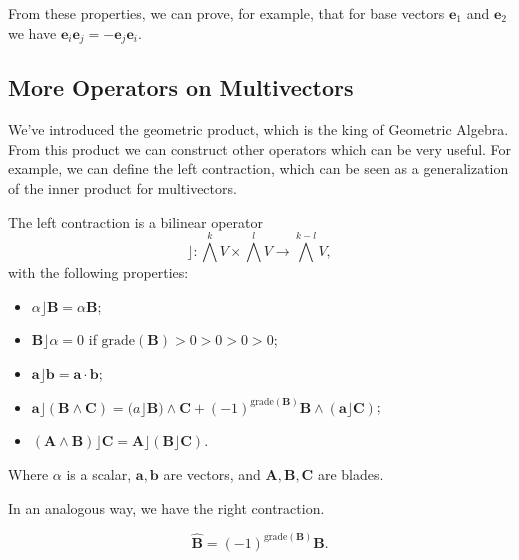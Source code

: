 From these properties, we can prove, for example, that for base vectors $\mathbf e_1$ and $\mathbf e_2$ we have
$\mathbf e_i \mathbf e_j = - \mathbf e_j \mathbf e_i$.

\subsection{More Operators on Multivectors}

We've introduced the geometric product, which is the king of Geometric Algebra.
From this product we can construct other operators which can be very useful. For example,
we can define the left contraction, which can be seen as a generalization of the inner product
for multivectors.

\begin{definition}
    The left contraction is a bilinear operator
    \begin{displaymath}
        \rfloor : \bigwedge^k V \times \bigwedge^l V \to \bigwedge^{k-l} V,
    \end{displaymath}
    with the following properties:
    \begin{itemize}
        \item $\alpha \rfloor \mathbf B  = \alpha \mathbf B$;
        \item $\mathbf B \rfloor \alpha = 0$ if $\text{grade}(\mathbf B) > 0 > 0 > 0 > 0$;
        \item $\mathbf a \rfloor \mathbf b = \mathbf a \cdot \mathbf b$;
        \item $\mathbf a \rfloor (\mathbf B \wedge \mathbf C) = \mathbf (a \rfloor \mathbf B)\wedge \mathbf C + (-1)^{\text{grade}(\mathbf B)} \mathbf B \wedge (\mathbf a \rfloor \mathbf C)$;
        \item $(\mathbf A \wedge \mathbf B) \rfloor \mathbf C = \mathbf A \rfloor (\mathbf B \rfloor \mathbf C)$.
    \end{itemize}
\end{definition}
Where $\alpha$ is a scalar, $\mathbf a, \mathbf b$ are vectors, and $\mathbf A, \mathbf B, \mathbf C$ are blades.

In an analogous way, we have the right contraction.


\begin{definition}
    \begin{displaymath}
        \hat{\mathbf B} = (-1) ^{\text{grade}(\mathbf B)} \mathbf B.
    \end{displaymath}
\end{definition}


